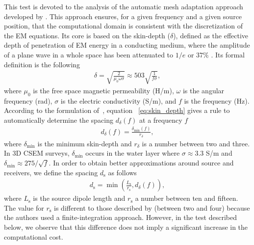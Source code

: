 \documentclass[review]{elsarticle}
\begin{document}
This test is devoted to the analysis of the automatic mesh adaptation approach developed by \citet{Plessix2007}. This approach ensures, for a given frequency and a given source position, that the computational domain is consistent with the discretization of the EM equations. Its core is based on the skin-depth ($\delta$), defined as the effective depth of penetration of EM energy in a conducting medium, where the amplitude of a plane wave in a whole space has been attenuated to $1/e$ or $37\%$ \citep{Sheriff2002}. Its formal definition is the following
\begin{align}
\delta = \sqrt{\frac{2}{\mu_{0}\omega\sigma}} \approx 503 \sqrt{\frac{1}{f \sigma}},
\label{eq:skin_depth}
\end{align}
where $\mu_{0}$ is the free space magnetic permeability (H/m), $\omega$ is the angular frequency (rad), $\sigma$ is the electric conductivity (S/m), and $f$ is the frequency (Hz). According to the formulation of~\citet{Plessix2007}, equation ~\eqref{eq:skin_depth} gives a rule to automatically determine the spacing $d_{\delta}(f)$ at a frequency $f$
\begin{align}
d_{\delta}(f) = \frac{\delta_{\min}(f)}{r_{\delta}},
\label{eq:skin_depth_frequency}
\end{align}
where $\delta_{\text{min}}$ is the minimum skin-depth and $r_{\delta}$ is a number between two and three. In 3D CSEM surveys, $\delta_{\text{min}}$ occurs in the water layer where $\sigma \approx 3.3$ S/m and $\delta_{\text{min}} \approx 275 / \sqrt{f}$. In order to obtain better approximations around source and receivers, we define the spacing $d_{\text{s}}$ as follows
\begin{align}
d_{\text{s}} = \min\left(\frac{L_{\text{s}}}{r_{\text{s}}}, d_{\delta} (f)\right),
\label{eq:source_refinement}
\end{align}
where $L_{\text{s}}$ is the source dipole length and $r_{\text{s}}$ a number between ten and fifteen. The value for $r_{\text{s}}$ is different to those described by \citet{Plessix2007} (between two and four) because the authors used a finite-integration approach. However, in the test described below, we observe that this difference does not imply a significant increase in the computational cost.
\end{document}
